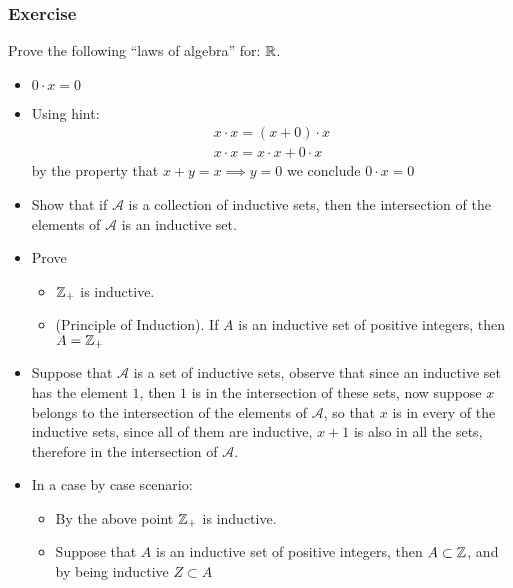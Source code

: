 \subsubsection*{Exercise}
\begin{exc}
	Prove the following ``laws of algebra'' for: $ \mathbb{R}  $.
	\begin{itemize}
		\item $ 0 \cdot x = 0 $
	\end{itemize}
\end{exc}
\begin{sol}
	\begin{itemize}
		\item Using hint:
		\begin{align*}
		x\cdot x = (x + 0) \cdot x \\
		x\cdot x = x \cdot x + 0 \cdot x
		\end{align*}
		by the property that $ x + y = x \implies y = 0 $ we conclude $ 0 \cdot x = 0 $
	\end{itemize}
\end{sol}
\begin{exc}
	\begin{itemize}
		\item Show that if $ \mathcal{A} $ is a collection of inductive sets, then the intersection of the elements of $ \mathcal{A} $ is an inductive set.
		\item Prove 
		\begin{itemize}
			\item $ \mathbb{Z}_+ $ is inductive.
			\item (Principle of Induction). If $ A $ is an inductive set of positive integers, then $ A = \mathbb{Z}_+ $
		\end{itemize}
	\end{itemize}
\end{exc}
\begin{sol}
	\begin{itemize}
		\item Suppose that $ \mathcal{A} $ is a set of inductive sets, observe that since an inductive set has the element $ 1 $, then $ 1 $ is in the intersection of these sets, now suppose $ x  $ belongs to the intersection of the elements of $ \mathcal{A} $, so that $ x $ is in every of the inductive sets, since all of them are inductive, $ x+1 $ is also in all the sets, therefore in the intersection of $ \mathcal{A} $.
		\item In a case by case scenario:
		\begin{itemize}
			\item By the above point $ \mathbb{Z}_+ $ is inductive.
			\item Suppose that $ A $ is an inductive set of positive integers, then $ A \subset \mathbb{Z} $, and by being inductive $ Z \subset A $
		\end{itemize}
	\end{itemize}
\end{sol}
